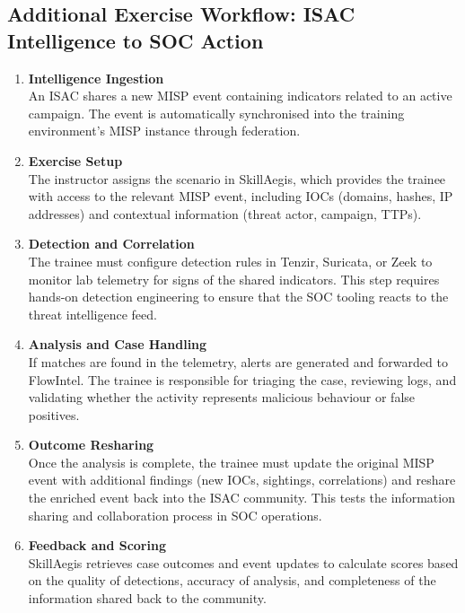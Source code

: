 \documentclass[10pt,a4paper]{report}
\begin{document}
\subsection{Additional Exercise Workflow: ISAC Intelligence to SOC Action}

\begin{enumerate}
  \item \textbf{Intelligence Ingestion} \\
  An ISAC shares a new MISP event containing indicators related to an active
  campaign. The event is automatically synchronised into the training
  environment’s MISP instance through federation.

  \item \textbf{Exercise Setup} \\
  The instructor assigns the scenario in SkillAegis, which provides the trainee
  with access to the relevant MISP event, including IOCs (domains, hashes, IP
  addresses) and contextual information (threat actor, campaign, TTPs).

  \item \textbf{Detection and Correlation} \\
  The trainee must configure detection rules in Tenzir, Suricata, or Zeek to
  monitor lab telemetry for signs of the shared indicators. This step requires
  hands-on detection engineering to ensure that the SOC tooling reacts to the
  threat intelligence feed.

  \item \textbf{Analysis and Case Handling} \\
  If matches are found in the telemetry, alerts are generated and forwarded to
  FlowIntel. The trainee is responsible for triaging the case, reviewing logs,
  and validating whether the activity represents malicious behaviour or false
  positives.

  \item \textbf{Outcome Resharing} \\
  Once the analysis is complete, the trainee must update the original MISP event
  with additional findings (new IOCs, sightings, correlations) and reshare the
  enriched event back into the ISAC community. This tests the information
  sharing and collaboration process in SOC operations.

  \item \textbf{Feedback and Scoring} \\
  SkillAegis retrieves case outcomes and event updates to calculate scores based
  on the quality of detections, accuracy of analysis, and completeness of the
  information shared back to the community.
\end{enumerate}
\end{document}
